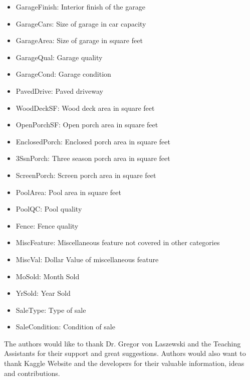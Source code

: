 \documentclass[sigconf]{acmart}
\begin{document}
\begin{itemize}
	\item GarageFinish: Interior finish of the garage
	\item GarageCars: Size of garage in car capacity
	\item GarageArea: Size of garage in square feet
	\item GarageQual: Garage quality
	\item GarageCond: Garage condition
	\item PavedDrive: Paved driveway
	\item WoodDeckSF: Wood deck area in square feet
	\item OpenPorchSF: Open porch area in square feet
	\item EnclosedPorch: Enclosed porch area in square feet
	\item 3SsnPorch: Three season porch area in square feet
	\item ScreenPorch: Screen porch area in square feet
	\item PoolArea: Pool area in square feet
	\item PoolQC: Pool quality
	\item Fence: Fence quality
	\item MiscFeature: Miscellaneous feature not covered in other categories
	\item MiscVal: Dollar Value of miscellaneous feature
	\item MoSold: Month Sold
	\item YrSold: Year Sold
	\item SaleType: Type of sale
	\item SaleCondition: Condition of sale
    \end{itemize}

	\nocite{*}
	
	\begin{acks}	
			The authors would like to thank Dr. Gregor von Laszewski and the Teaching Assistants for their support and great suggestions. Authors would also want to thank Kaggle Website and the developers for their valuable information, ideas and contributions.		
	\end{acks}


	
	 	

	
\end{document}
